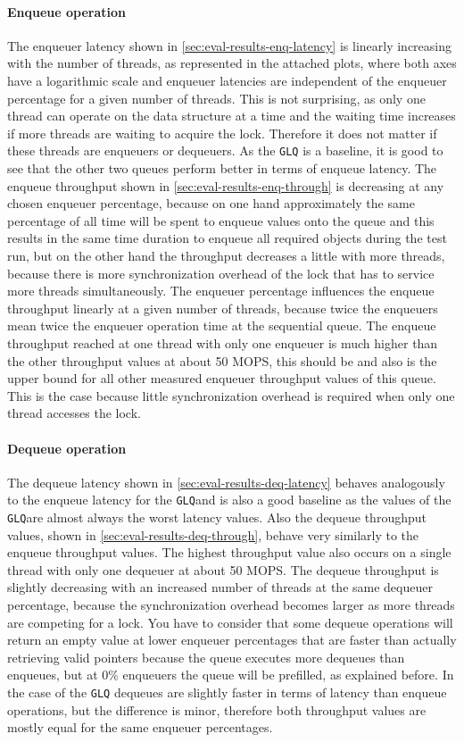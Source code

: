 \documentclass{article}
\newcommand{\GLQ}{\texttt{GLQ}}
\begin{document}
\paragraph{Enqueue operation}
The enqueuer latency shown in \ref{sec:eval-results-enq-latency} is linearly increasing with the number of threads, as represented in the attached plots, where both axes have a logarithmic scale and enqueuer latencies are independent of the enqueuer percentage for a given number of threads. This is not surprising, as only one thread can operate on the data structure at a time and the waiting time increases if more threads are waiting to acquire the lock. Therefore it does not matter if these threads are enqueuers or dequeuers. As the \GLQ{} is a baseline, it is good to see that the other two queues perform better in terms of enqueue latency. The enqueue throughput shown in \ref{sec:eval-results-enq-through} is decreasing at any chosen enqueuer percentage, because on one hand approximately the same percentage of all time will be spent to enqueue values onto the queue and this results in the same time duration to enqueue all required objects during the test run, but on the other hand the throughput decreases a little with more threads, because there is more synchronization overhead of the lock that has to service more threads simultaneously. The enqueuer percentage influences the enqueue throughput linearly at a given number of threads, because twice the enqueuers mean twice the enqueuer operation time at the sequential queue. The enqueue throughput reached at one thread with only one enqueuer is much higher than the other throughput values at about 50 MOPS, this should be and also is the upper bound for all other measured enqueuer throughput values of this queue. This is the case because little synchronization overhead is required when only one thread accesses the lock.
\paragraph{Dequeue operation}
The dequeue latency shown in \ref{sec:eval-results-deq-latency} behaves analogously to the enqueue latency for the \GLQ and is also a good baseline as the values of the \GLQ are almost always the worst latency values. Also the dequeue throughput values, shown in \ref{sec:eval-results-deq-through}, behave very similarly to the enqueue throughput values. The highest throughput value also occurs on a single thread with only one dequeuer at about 50 MOPS. The dequeue throughput is slightly decreasing with an increased number of threads at the same dequeuer percentage, because the synchronization overhead becomes larger as more threads are competing for a lock. You have to consider that some dequeue operations will return an empty value at lower enqueuer percentages that are faster than actually retrieving valid pointers because the queue executes more dequeues than enqueues, but at 0\% enqueuers the queue will be prefilled, as explained before. In the case of the \GLQ{} dequeues are slightly faster in terms of latency than enqueue operations, but the difference is minor, therefore both throughput values are mostly equal for the same enqueuer percentages.
\end{document}
